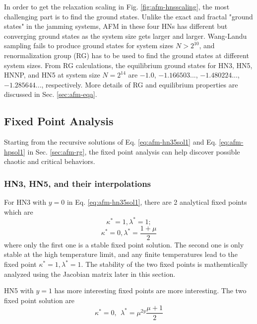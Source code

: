 In order to get the relaxation scaling in Fig. \ref{fig:afm-hnsscaling}, the most challenging part is to find the ground states. Unlike the exact and fractal "ground states" in the jamming systems, AFM in these four HNs has different but converging ground states as the system size gets larger and larger. Wang-Landu sampling fails to produce ground states for system sizes $N>2^{10}$, and renormalization group (RG) has to be used to find the ground states at different system sizes. From RG calculations, the equilibrium ground states for HN3, HN5, HNNP, and HN5 at system size $N=2^{14}$ are $-1.0$, $-1.166503...$, $-1.480224...$, $-1.285644...$, respectively.  More details of  RG and equilibrium properties are discussed in Sec. \ref{sec:afm-eqa}.

\subsection{Fixed Point Analysis}
\label{sec:afm-fpa}
Starting from the recursive solutions of Eq. \ref{eq:afm-hn35sol1} and Eq. \ref{eq:afm-hpsol1} in Sec. \ref{sec:afm-rg}, the fixed point analysis can help discover possible chaotic and critical behaviors. 

\subsubsection{ HN3, HN5, and their interpolations }
For HN3 with $y=0$ in Eq. \ref{eq:afm-hn35sol1}, there are 2 analytical fixed points which are
\begin{equation}
\displaystyle \kappa^* = 1, \lambda^* =1; 
\label{eq:afm-fps3-1}
\end{equation}
\begin{equation}
\displaystyle \kappa^* = 0, \lambda^* =\frac{1+\mu}{2} 
\label{eq:afm-fps3-2}
\end{equation}
where only the first one is a stable fixed point solution. The second one is only stable at the high temperature limit, and any finite temperatures lead to the fixed point $\kappa^* =1, \lambda^* = 1.$ The stability of the two fixed points is mathemtically analyzed using the Jacobian matrix later in this section.

HN5 with $y=1$ has more interesting fixed points are more interesting. The two fixed point solution are
\begin{equation}
\kappa^* = 0, \ \  \lambda^* = \mu^{2y}\frac{\mu+1}{2}
\label{eq:afm-fps5-1}
\end{equation}

